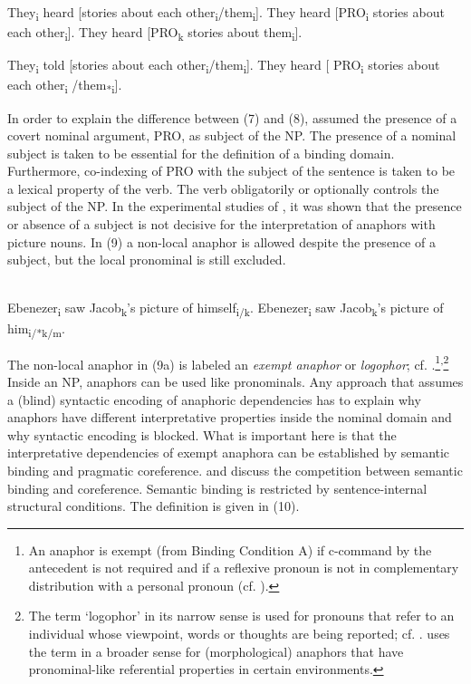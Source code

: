 \documentclass[output=paper]{langsci/langscibook}
\begin{document}
\ea%
    \citep[166–167]{Chomsky1986Knowledge}\label{ex:wein:7}
\ea  They\textsubscript{i} heard [stories about each other\textsubscript{i}\slash them\textsubscript{i}].
\ex  They heard [PRO\textsubscript{i} stories about each other\textsubscript{i}].
\ex  They heard [PRO\textsubscript{k} stories about them\textsubscript{i}].
    \z
\z

\ea%
    \label{ex:wein:8}
    \ea They\textsubscript{i} told [stories about each other\textsubscript{i}\slash *them\textsubscript{i}].
    \ex They heard [ PRO\textsubscript{i} stories about each other\textsubscript{i} /them\textsubscript{*i}].
    \z
\z

In order to explain the difference between (7) and (8), \citet{Chomsky1986Knowledge} assumed the presence of a covert nominal argument, PRO, as subject of the NP. The presence of a nominal subject is taken to be essential for the definition of a binding domain. Furthermore, co-indexing of PRO with the subject of the sentence is taken to be a lexical property of the verb. The verb obligatorily or optionally controls the subject of the NP. In the experimental studies of \citet{Runner2005}, it was shown that the presence or absence of a subject is not decisive for the interpretation of anaphors with picture nouns. In (9) a non-local anaphor is allowed despite the presence of a subject, but the local pronominal is still excluded.

\ea%
    \citet[597]{Runner2005}\label{ex:wein:9}\\
    \ea Ebenezer\textsubscript{i} saw Jacob\textsubscript{k}'s picture of himself\textsubscript{i/k}.
    \ex Ebenezer\textsubscript{i} saw Jacob\textsubscript{k}'s picture of him\textsubscript{i/*k/m}.
    \z
\z    

The non-local anaphor in (9a) is labeled an \textit{exempt anaphor} or \textit{logophor}; cf. \citet{Reuland2011}.\footnote{An anaphor is exempt (from Binding Condition A) if c-command by the antecedent is not required and if a reflexive pronoun is not in complementary distribution with a personal pronoun (cf. \citealt{Büring2005}).}\textsuperscript{,}\footnote{The term ‘logophor’ in its narrow sense is used for pronouns that refer to an individual whose viewpoint, words or thoughts are being reported; cf. \citet{Speas2004}. \citet{Reuland2011} uses the term in a broader sense for (morphological) anaphors that have pronominal-like referential properties in certain environments.}  Inside an NP, anaphors can be used like pronominals. Any approach that assumes a (blind) syntactic encoding of anaphoric dependencies has to explain why anaphors have different interpretative properties inside the nominal domain and why syntactic encoding is blocked. What is important here is that the interpretative dependencies of exempt anaphora can be established by semantic binding and pragmatic coreference. \citet{Reinhart2006} and \citet{Reuland2011} discuss the competition between semantic binding and coreference. Semantic binding is restricted by sentence-internal structural conditions. The definition is given in (10). 
\end{document}
